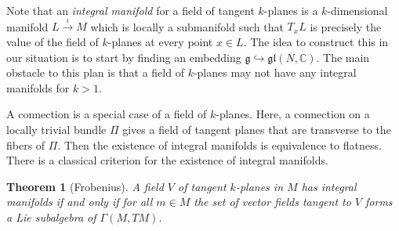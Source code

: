 \documentclass[leqno, openany]{memoir}
\newtheorem{thm}{Theorem}[section]
\theoremstyle{definition}
\theoremstyle{remark}
\theoremstyle{plain}
\theoremstyle{definition}
\theoremstyle{remark}
\newcommand{\C}{\mathbb{C}}
\newcommand{\mf}[1]{\mathfrak{#1}}
\begin{document}
Note that an \textit{integral manifold} for a field of tangent $k$-planes is a $k$-dimensional manifold $L \xrightarrow{\iota} M$ which is locally a submanifold such that $T_xL$ is precisely the value of the field of $k$-planes at every point $x \in L$. The idea to construct this in our situation is to start by finding an embedding $\mf{g} \hookrightarrow \mf{gl}(N, \C)$. The main obstacle to this plan is that a field of $k$-planes may not have any integral manifolds for $k > 1$. 

A connection is a special case of a field of $k$-planes. Here, a connection on a locally trivial bundle $\Pi$ gives a field of tangent planes that are transverse to the fibers of $\Pi$. Then the existence of integral manifolds is equivalence to flatness. There is a classical criterion for the existence of integral manifolds.

\begin{thm}[Frobenius]
    A field $V$ of tangent $k$-planes in $M$ has integral manifolds if and only if for all $m \in M$ the set of vector fields tangent to $V$ forms a Lie subalgebra of $\Gamma(M, TM)$.
\end{thm}
\end{document}
